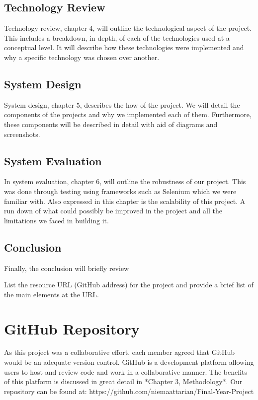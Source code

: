 \subsection{Technology Review}
Technology review, chapter 4, will outline the technological aspect of the project. This includes a breakdown, in depth, of each of the technologies used at a conceptual level. It will describe how these technologies were implemented and why a specific technology was chosen over another.

\subsection{System Design}
System design, chapter 5, describes the how of the project. We will detail the components of the projects and why we implemented each of them. Furthermore, these components will be described in detail with aid of diagrams and screenshots.

\subsection{System Evaluation}
In system evaluation, chapter 6, will outline the robustness of our project. This was done through testing using frameworks such as Selenium which we were familiar with. Also expressed in this chapter is the scalability of this project. A run down of what could possibly be improved in the project and all the limitations we faced in building it.

\subsection{Conclusion}
Finally, the conclusion will briefly review 

List the resource URL (GitHub address) for the project and provide a brief list of the main elements at the URL.

\section{GitHub Repository}
As this project was a collaborative effort, each member agreed that GitHub would be an adequate version control. GitHub is a development platform allowing users to host and review code and work in a collaborative manner. The benefits of this platform is discussed in great detail in *Chapter 3, Methodology*. Our repository can be found at: https://github.com/niemaattarian/Final-Year-Project 

